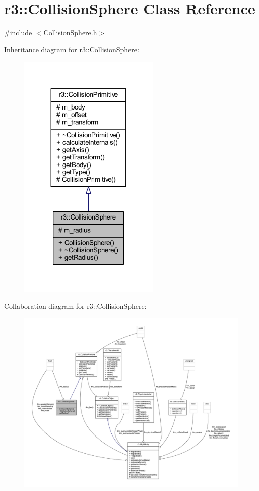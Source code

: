 \hypertarget{classr3_1_1_collision_sphere}{}\section{r3\+:\+:Collision\+Sphere Class Reference}
\label{classr3_1_1_collision_sphere}


{\ttfamily \#include $<$Collision\+Sphere.\+h$>$}



Inheritance diagram for r3\+:\+:Collision\+Sphere\+:\nopagebreak
\begin{figure}[H]
\begin{center}
\leavevmode
\includegraphics[width=191pt]{classr3_1_1_collision_sphere__inherit__graph}
\end{center}
\end{figure}


Collaboration diagram for r3\+:\+:Collision\+Sphere\+:\nopagebreak
\begin{figure}[H]
\begin{center}
\leavevmode
\includegraphics[width=350pt]{classr3_1_1_collision_sphere__coll__graph}
\end{center}
\end{figure}
